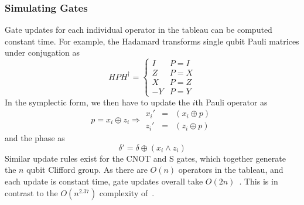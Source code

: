 \subsubsection{Simulating Gates}
Gate updates for each individual operator in the tableau can be computed constant time. For example, the Hadamard transforms single qubit Pauli matrices under conjugation as
\begin{equation}
    HPH^{\dagger} = \begin{cases}
        I & P=I\\
        Z & P=X\\
        X & P=Z\\
        -Y & P=Y
        \end{cases}
\end{equation}
In the symplectic form, we then have to update the $i$th Pauli operator as
\begin{equation}
    p = x_{i} \oplus z_{i} \Rightarrow \begin{array}{lcr}
    x_{i}' & = & \left(x_{i}\oplus p\right)\\
    z_{i}' & = & \left(z_{i}\oplus p\right) 
    \end{array}
\end{equation}
and the phase as
\begin{equation}
\delta' = \delta \oplus \left(x_{i}\wedge z_{i}\right)
\end{equation}
Similar update rules exist for the CNOT and S gates, which together generate the $n$ qubit Clifford group. As there are $O(n)$ operators in the tableau, and each update is constant time, gate updates overall take $O\left(2n\right)$~\cite{Aaronson2004}. This is in contrast to the $O(n^{2.37})$ complexity of~\cite{Dehaene2003}.
